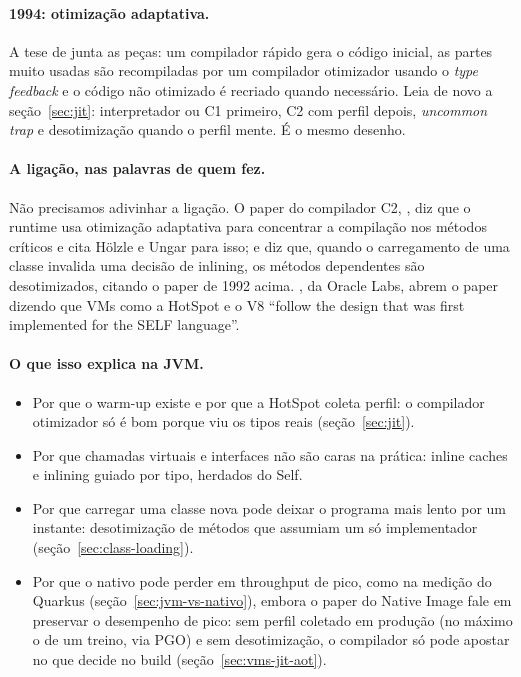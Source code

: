 \paragraph{1994: otimização adaptativa.}
A tese de \textcite{paper:holzle-thesis-adaptive-optimization} junta as
peças: um compilador rápido gera o código inicial, as partes muito usadas
são recompiladas por um compilador otimizador usando o \emph{type
feedback} e o código não otimizado é recriado quando necessário. Leia de
novo a seção~\ref{sec:jit}: interpretador ou C1 primeiro, C2 com perfil
depois, \emph{uncommon trap} e desotimização quando o perfil mente. É o
mesmo desenho.

\paragraph{A ligação, nas palavras de quem fez.}
Não precisamos adivinhar a ligação. O paper do compilador C2,
\textcite{paper:hotspot-server-compiler}, diz que o runtime usa
otimização adaptativa para concentrar a compilação nos métodos críticos
e cita Hölzle e Ungar para isso; e diz que, quando o carregamento de uma
classe invalida uma decisão de inlining, os métodos dependentes são
desotimizados, citando o paper de 1992 acima.
\textcite{paper:truffle-partial-evaluation}, da Oracle Labs, abrem o
paper dizendo que VMs como a HotSpot e o V8 \enquote{follow the design
that was first implemented for the SELF language}.

\paragraph{O que isso explica na JVM.}
\begin{itemize}
\item Por que o warm-up existe e por que a HotSpot coleta perfil: o
  compilador otimizador só é bom porque viu os tipos reais
  (seção~\ref{sec:jit}).
\item Por que chamadas virtuais e interfaces não são caras na prática:
  inline caches e inlining guiado por tipo, herdados do Self.
\item Por que carregar uma classe nova pode deixar o programa mais lento
  por um instante: desotimização de métodos que assumiam um só
  implementador (seção~\ref{sec:class-loading}).
\item Por que o nativo pode perder em throughput de pico, como na
  medição do Quarkus (seção~\ref{sec:jvm-vs-nativo}), embora o paper do
  Native Image fale em preservar o desempenho de pico: sem perfil
  coletado em produção (no máximo o de um treino, via PGO) e sem
  desotimização, o compilador só pode apostar no que decide no build (seção~\ref{sec:vms-jit-aot}).
\end{itemize}
